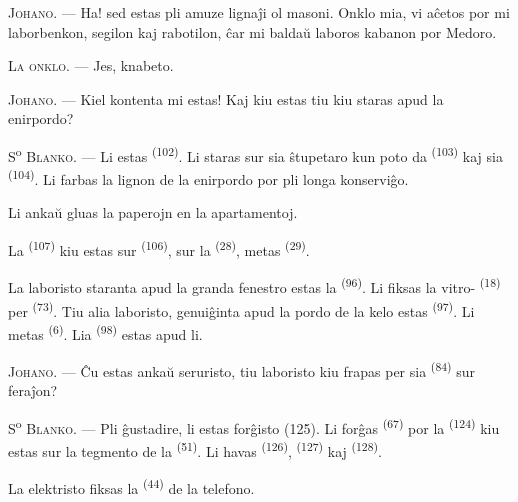 \textsc{Johano}. --- Ha! sed estas pli amuze lignaĵi ol masoni. Onklo mia, vi
aĉetos por mi laborbenkon, segilon kaj rabotilon, ĉar mi baldaŭ laboros
kabanon por Medoro.

\textsc{La onklo}. --- Jes, knabeto.

\textsc{Johano}. --- Kiel kontenta mi estas! Kaj kiu estas tiu kiu staras apud
la enirpordo?

\VUsaut{3.0mm}
\VUsaut{3.0mm}

S\textsuperscript{o} \textsc{Blanko}. --- Li estas 
\textsuperscript{(102)}. Li staras sur sia ŝtupetaro kun poto da 
\textsuperscript{(103)} kaj sia  \textsuperscript{(104)}. Li
farbas la lignon de la enirpordo por pli longa konserviĝo.

Li ankaŭ gluas la paperojn en la apartamentoj.

La  \textsuperscript{(107)} kiu estas sur 
\textsuperscript{(106)}, sur la  \textsuperscript{(28)}, metas
 \textsuperscript{(29)}.

La laboristo staranta apud la granda fenestro estas la 
\textsuperscript{(96)}. Li fiksas la vitro-
\textsuperscript{(18)} per  \textsuperscript{(73)}. Tiu alia
laboristo, genuiĝinta apud la pordo de la kelo estas 
\textsuperscript{(97)}. Li metas  \textsuperscript{(6)}. Lia
 \textsuperscript{(98)} estas apud li.

\textsc{Johano}. --- Ĉu estas ankaŭ seruristo, tiu laboristo kiu frapas per sia
 \textsuperscript{(84)} sur feraĵon?

S\textsuperscript{o} \textsc{Blanko}. --- Pli ĝustadire, li estas forĝisto
(125). Li forĝas  \textsuperscript{(67)} por la
 \textsuperscript{(124)} kiu estas sur la tegmento de la
 \textsuperscript{(51)}. Li havas 
\textsuperscript{(126)},  \textsuperscript{(127)} kaj
 \textsuperscript{(128)}.

La elektristo fiksas la  \textsuperscript{(44)} 
de la telefono.

\VUsaut{3.0mm}

